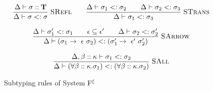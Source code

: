 \begin{figure}[p]
    \small
    \noindent{}

    \medskip
    \begin{gather*}
        \frac{\Delta \vdash \sigma :: \mathbf{T}}
             {\Delta \vdash \sigma <: \sigma}
             \;\textsc{SRefl}
        \qquad
        \frac{\Delta \vdash \sigma_1 <: \sigma_2
              \qquad \Delta \vdash \sigma_2 <: \sigma_3}
             {\Delta \vdash \sigma_1 <: \sigma_3}
             \;\textsc{STrans}
        \\[8pt]
        \frac{\Delta \vdash \sigma'_1 <: \sigma_1
              \qquad \epsilon \subseteq \epsilon'
              \qquad \Delta \vdash \sigma_2 <: \sigma'_2}
             {\Delta \vdash
              (\sigma_1 \rightarrow~\epsilon~\sigma_2)
              <: (\sigma'_1 \rightarrow~\epsilon'~\sigma'_2)}
             \;\textsc{SArrow}
        \\[8pt]
        \frac{\Delta,\beta :: \kappa \vdash \sigma_1 <: \sigma_2}
             {\Delta \vdash
              (\forall\beta :: \kappa.\sigma_1)
              <: (\forall\beta :: \kappa.\sigma_2)}
             \;\textsc{SAll}
    \end{gather*}

    \caption{Subtyping rules of System F$^{\xi}$}
    \label{systemf:subtyping-rules}
\end{figure}
